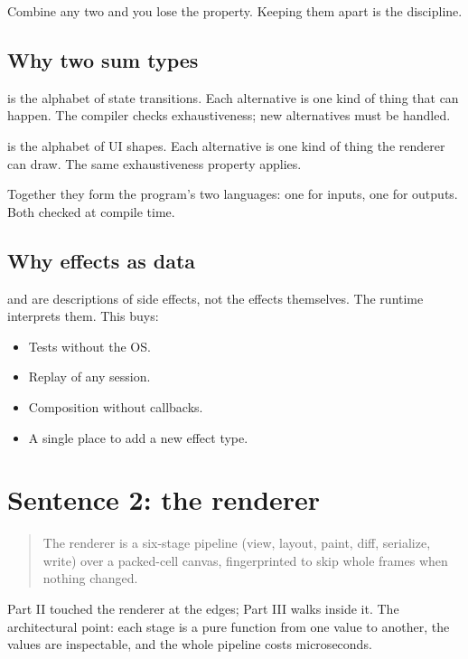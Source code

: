 Combine any two and you lose the property. Keeping them apart
is the discipline.

\subsection*{Why two sum types}

 is the alphabet of state transitions. Each
alternative is one kind of thing that can happen. The compiler
checks exhaustiveness; new alternatives must be handled.

 is the alphabet of UI shapes. Each alternative is
one kind of thing the renderer can draw. The same exhaustiveness
property applies.

Together they form the program's two languages: one for
inputs, one for outputs. Both checked at compile time.

\subsection*{Why effects as data}

 and  are descriptions of side effects,
not the effects themselves. The runtime interprets them. This
buys:

\begin{itemize}[leftmargin=*]
  \item Tests without the OS.
  \item Replay of any session.
  \item Composition without callbacks.
  \item A single place to add a new effect type.
\end{itemize}

\section{Sentence 2: the renderer}

\begin{quote}
The renderer is a six-stage pipeline (view, layout, paint,
diff, serialize, write) over a packed-cell canvas, fingerprinted
to skip whole frames when nothing changed.
\end{quote}

Part II touched the renderer at the edges; Part III walks
inside it. The architectural point: each stage is a pure
function from one value to another, the values are inspectable,
and the whole pipeline costs microseconds.

